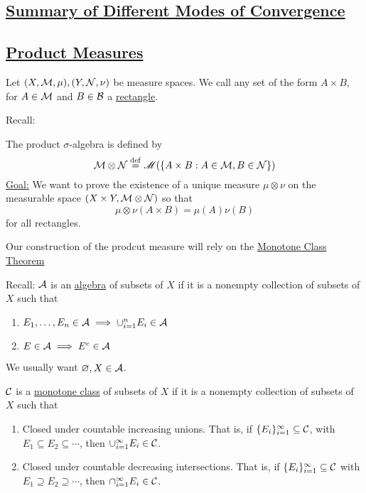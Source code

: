 \documentclass[x11names,reqno,14pt]{extarticle}
\newcommand*{\oo}{\infty}
\newcommand{\seq}[1]{_{#1 = 1}^\oo}
\begin{document}
\subsection*{\underline{Summary of Different Modes of Convergence}}
\begin{center}
\end{center}

\subsection*{\underline{Product Measures}}

Let $(X, \mathcal{M}, \mu), (Y, \mathcal{N}, \nu)$ be measure spaces. We call any set of the form $A \times B$, for $A\in\mathcal{M}$ and $B \in \mathcal{B}$ a \underline{rectangle}.

Recall: 

The product $\sigma$-algebra is defined by 
\[
\mathcal{M}\otimes\mathcal{N}\overset{\mathrm{def}}{=} \mathscr{M}(\{A\times B: A\in\mathcal{M}, B \in \mathcal{N}\})
\]
\underline{Goal:} We want to prove the existence of a unique measure $\mu\otimes\nu$ on the measurable space $(X\times Y, \mathcal{M}\otimes\mathcal{N})$ so that 
\[
\mu\otimes\nu(A\times B) = \mu(A)\nu(B)
\]
for all rectangles. 

Our construction of the prodcut measure will rely on the \underline{Monotone Class Theorem}

Recall:
$\mathcal{A}$ is an \underline{algebra} of subsets of $X$ if it is a nonempty collection of subsets of $X$ such that
\begin{enumerate}[label=(\roman*)]
\item $E_1, \dots, E_n \in \mathcal{A} \implies \cup_{i=1}^nE_i\in\mathcal{A}$ 
\item $E\in \mathcal{A} \implies E^c\in\mathcal{A}$
\end{enumerate}
\rem We usually want $\varnothing, X \in \mathcal{A}$. 

$\mathcal{C}$ is a \underline{monotone class} of subsets of $X$ if it is a nonempty collection of subsets of $X$ such that 
\begin{enumerate}[label=(\roman*)]
\item Closed under countable increasing unions. That is, if $\{E_i\}\seq{i}\subseteq\mc{C}$, with $E_1\subseteq E_2\subseteq \cdots$, then $\cup\seq{i}E_i\in\mc{C}$. 
\item Closed under countable decreasing intersections. That is, if $\{E_i\}\seq{i}\subseteq\mc{C}$ with $E_1\supseteq E_2\supseteq \cdots$, then $\cap\seq{i}E_i\in\mc{C}$. 
\end{enumerate} 
\end{document}
